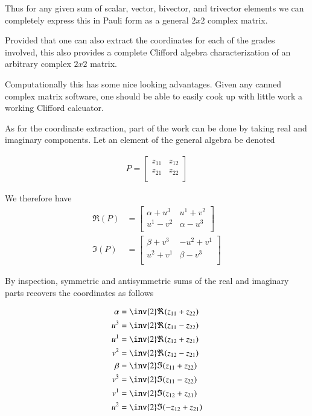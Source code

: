 \documentclass{article}
\begin{document}
Thus for any given sum of scalar, vector, bivector, and trivector elements
we can completely express this in Pauli form as a general $2 x 2$ complex
matrix.

Provided that one can also extract the coordinates for each of the grades
involved, this also provides a complete Clifford algebra characterization
of an arbitrary complex $2 x 2$ matrix.

Computationally this has some nice looking advantages.  Given any canned complex
matrix software, one should be able to easily cook up with little work a 
working  Clifford calcuator.

As for the coordinate extraction, part of the work can be done by taking real and imaginary components.  Let an element of the general algebra be denoted

\begin{align*}
P = 
\begin{bmatrix}
z_{11} & z_{12} \\
z_{21} & z_{22} \\
\end{bmatrix}
\end{align*}

We therefore have
\begin{align*}
\Re(P) &=
\begin{bmatrix}
\alpha + u^3   & u^1 + v^2 \\
u^1 - v^2      & \alpha -u^3 \\
\end{bmatrix} \\
\Im(P) &=
\begin{bmatrix}
\beta + v^3 & -u^2 + v^1 \\
u^2 + v^1 & \beta - v^3 \\
\end{bmatrix}
\end{align*}

By inspection, symmetric and antisymmetric sums of the real and imaginary parts recovers the coordinates as follows

\begin{align*}
\alpha   &= \inv{2} \Re( z_{11} + z_{22} ) \\
u^3      &= \inv{2} \Re( z_{11} - z_{22} ) \\
u^1      &= \inv{2} \Re( z_{12} + z_{21} ) \\
v^2      &= \inv{2} \Re( z_{12} - z_{21} ) \\
\beta    &= \inv{2} \Im( z_{11} + z_{22} ) \\
v^3      &= \inv{2} \Im( z_{11} - z_{22} ) \\
v^1      &= \inv{2} \Im( z_{12} + z_{21} ) \\
u^2      &= \inv{2} \Im( -z_{12} + z_{21} ) \\
\end{align*}
\end{document}
